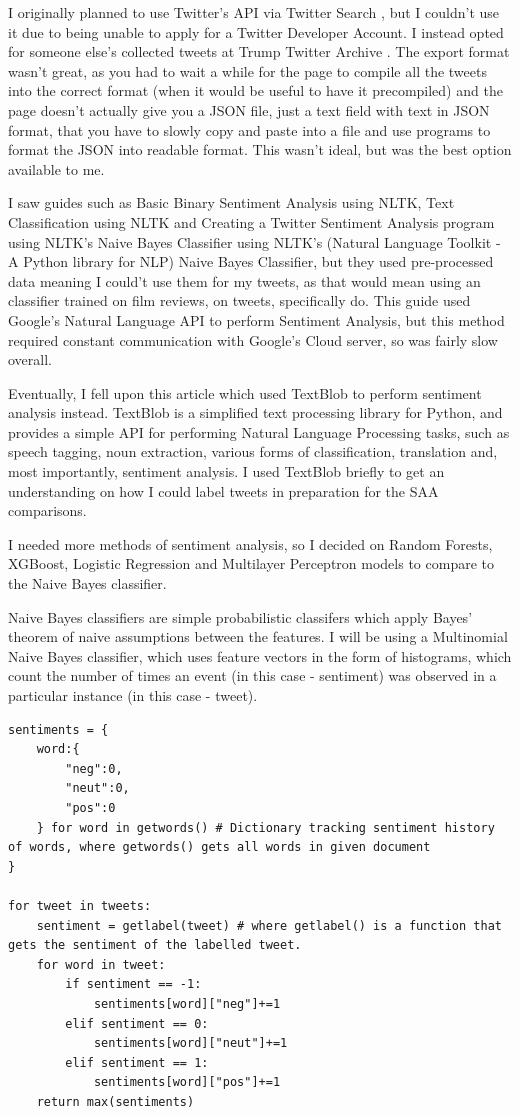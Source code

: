 \documentclass{article}
\begin{document}
I originally planned to use Twitter's API via Twitter Search \autocite[3]{ckoepp_2018}, but I couldn't use it due to being unable to apply for a Twitter Developer Account.
I instead opted for someone else's collected tweets at Trump Twitter Archive \autocite[3]{trump_archive}.
The export format wasn't great, as you had to wait a while for the page to compile all the tweets into the correct format (when it would be useful to have it precompiled) and the page doesn't actually give you a JSON file, just a text field with text in JSON format, that you have to slowly copy and paste into a file and use programs to format the JSON into readable format.
This wasn't ideal, but was the best option available to me.

I saw guides such as Basic Binary Sentiment Analysis using NLTK, Text Classification using NLTK and Creating a Twitter Sentiment Analysis program using NLTK's Naive Bayes Classifier using NLTK's (Natural Language Toolkit - A Python library for NLP) Naive Bayes Classifier, but they used pre-processed data meaning I could't use them for my tweets, as that would mean using an classifier trained on film reviews, on tweets, specifically do.
This guide used Google's Natural Language API to perform Sentiment Analysis, but this method required constant communication with Google's Cloud server, so was fairly slow overall.

Eventually, I fell upon this article which used TextBlob to perform sentiment analysis instead.
TextBlob is a simplified text processing library for Python, and provides a simple API for performing Natural Language Processing tasks, such as speech tagging, noun extraction, various forms of classification, translation and, most importantly, sentiment analysis.
I used TextBlob briefly to get an understanding on how I could label tweets in preparation for the SAA comparisons.

I needed more methods of sentiment analysis, so I decided on Random Forests, XGBoost, Logistic Regression and Multilayer Perceptron models to compare to the Naive Bayes classifier.

Naive Bayes classifiers are simple probabilistic classifers which apply Bayes' theorem of naive assumptions between the features.
I will be using a Multinomial Naive Bayes classifier, which uses feature vectors in the form of histograms, which count the number of times an event (in this case - sentiment) was observed in a particular instance (in this case - tweet).

\begin{lstlisting}[caption={Multinomial Naive Bayes classifier psuedopythoncode},captionpos=b]
sentiments = {
	word:{
		"neg":0,
		"neut":0,
		"pos":0
	} for word in getwords() # Dictionary tracking sentiment history of words, where getwords() gets all words in given document
}

for tweet in tweets:
	sentiment = getlabel(tweet) # where getlabel() is a function that gets the sentiment of the labelled tweet.
	for word in tweet:
		if sentiment == -1:
			sentiments[word]["neg"]+=1
		elif sentiment == 0:
			sentiments[word]["neut"]+=1
		elif sentiment == 1:
			sentiments[word]["pos"]+=1
	return max(sentiments)
\end{lstlisting}
\end{document}
